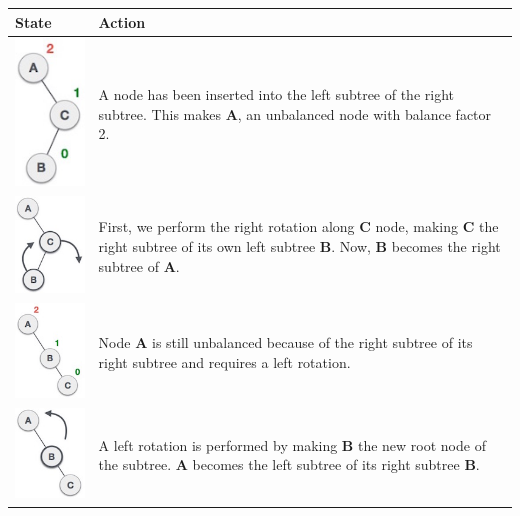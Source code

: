 \begin{longtable}{| M{.20\textwidth} | p{.80\textwidth} |} 
\hline
\textbf{State} & \textbf{Action} \\
\hline
\includegraphics[scale=.40]{images/left_subtree_of_right_subtree.jpg} & A node has been inserted into the left subtree of the right subtree. This makes \textbf{A}, an unbalanced node with balance factor 2.\\
\hline
\includegraphics[scale=.40]{images/subtree_right_rotation.jpg} & First, we perform the right rotation along \textbf{C} node, making \textbf{C} the right subtree of its own left subtree \textbf{B}. Now, \textbf{B} becomes the right subtree of \textbf{A}. \\
\hline
\includegraphics[scale=.40]{images/right_unbalanced_tree.jpg} & Node \textbf{A} is still unbalanced because of the right subtree of its right subtree and requires a left rotation.\\
\hline
\includegraphics[scale=.40]{images/left_rotation.jpg} & A left rotation is performed by making \textbf{B} the new root node of the subtree. \textbf{A} becomes the left subtree of its right subtree \textbf{B}. \\

\end{longtable}
